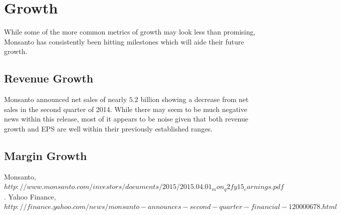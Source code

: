 \documentclass[11pt,letterpaper,english]{article}
\begin{document}
\section{Growth}
While some of the more common metrics of growth may look less than promising, Monsanto has consistently been hitting milestones which will aide their future growth.

\subsection{Revenue Growth}
Monsanto announced net sales of nearly $5.2$ billion showing a decrease from net sales in the second quarter of 2014. While there may seem to be much negative news within this release, most of it appears to be noise given that both revenue growth and EPS are well within their previously established ranges.

\subsection{Margin Growth}

\newpage
\begin{thebibliography}{9}
    Monsanto,
    \emph{$http://www.monsanto.com/investors/documents/2015/2015.04.01_mon_q2fy15_earnings.pdf$}.
     Yahoo Finance,
     \emph{$http://finance.yahoo.com/news/monsanto-announces-second-quarter-financial-120000678.html$}
\end{thebibliography}
\end{document}
